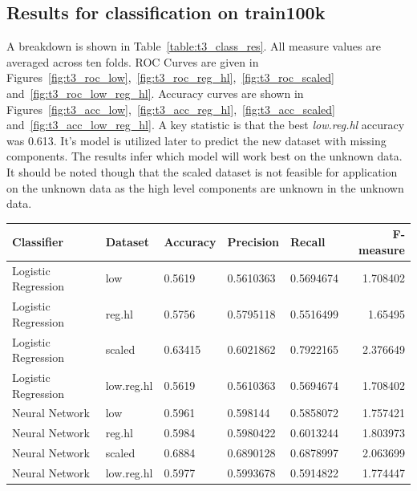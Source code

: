 \documentclass[11pt]{article}
\begin{document}
\subsection{Results for classification on train100k}
A breakdown is shown in Table~\ref{table:t3_class_res}. All measure values are averaged across ten folds. ROC Curves are given in Figures~\ref{fig:t3_roc_low},~\ref{fig:t3_roc_reg_hl},~\ref{fig:t3_roc_scaled} and~\ref{fig:t3_roc_low_reg_hl}. Accuracy curves are shown in Figures~\ref{fig:t3_acc_low},~\ref{fig:t3_acc_reg_hl},~\ref{fig:t3_acc_scaled} and~\ref{fig:t3_acc_low_reg_hl}. A key statistic is that the best \textit{low.reg.hl} accuracy was 0.613. It's model is utilized later to predict the new dataset with missing components. The results infer which model will work best on the unknown data. It should be noted though that the scaled dataset is not feasible for application on the unknown data as the high level components are unknown in the unknown data.
\begin{center}   
 \begin{tabular}{@{}lllllr@{}}
	\toprule[1.5pt]
	Classifier & Dataset & Accuracy & Precision & Recall & F-measure\\
	\toprule[1.5pt]
	Logistic Regression & low & 0.5619 & 0.5610363 & 0.5694674 & 1.708402 \\
	Logistic Regression & reg.hl & 0.5756 & 0.5795118 & 0.5516499 & 1.65495  \\
	Logistic Regression & scaled & 0.63415 & 0.6021862 & 0.7922165 & 2.376649 \\
	Logistic Regression & low.reg.hl & 0.5619 & 0.5610363 & 0.5694674 & 1.708402 \\
	Neural Network & low & 0.5961 & 0.598144 & 0.5858072 & 1.757421 \\
	Neural Network & reg.hl & 0.5984 & 0.5980422 & 0.6013244 & 1.803973 \\
	Neural Network & scaled & 0.6884 & 0.6890128 & 0.6878997 & 2.063699 \\
	Neural Network & low.reg.hl & 0.5977 & 0.5993678 & 0.5914822 & 1.774447 \\
	\bottomrule[1.25pt]
    \end{tabular}
    \label{table:t3_class_res}
 \end{center}
\end{document}
